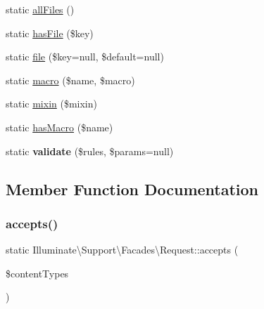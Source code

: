\begin{DoxyCompactItemize}
static \mbox{\hyperlink{class_illuminate_1_1_support_1_1_facades_1_1_request_af20e1617b83e1399b3e4b80216b8413e}{all\+Files}} ()
\item 
static \mbox{\hyperlink{class_illuminate_1_1_support_1_1_facades_1_1_request_a14261036d9d8192ae6bc760d7d1a354d}{has\+File}} (\$key)
\item 
static \mbox{\hyperlink{class_illuminate_1_1_support_1_1_facades_1_1_request_a1082105b18377b3403a0e132c9b24901}{file}} (\$key=null, \$default=null)
\item 
static \mbox{\hyperlink{class_illuminate_1_1_support_1_1_facades_1_1_request_a56125949490a1267249e6260e2e56552}{macro}} (\$name, \$macro)
\item 
static \mbox{\hyperlink{class_illuminate_1_1_support_1_1_facades_1_1_request_a6584f6b2aeabae7841abca43ba830d0a}{mixin}} (\$mixin)
\item 
static \mbox{\hyperlink{class_illuminate_1_1_support_1_1_facades_1_1_request_a0ef2bf9bd9b70f547700ce96c5b41076}{has\+Macro}} (\$name)
\item 
\mbox{\label{class_illuminate_1_1_support_1_1_facades_1_1_request_a7761fe19ca20c58ed941c6b834c2e0a8}} 
static {\bfseries validate} (\$rules, \$params=null)
\end{DoxyCompactItemize}


\subsection{Member Function Documentation}
\mbox{\label{class_illuminate_1_1_support_1_1_facades_1_1_request_a356cb2b43b1c9350e34d5e8ab95230a3}} 
\subsubsection{\texorpdfstring{accepts()}{accepts()}}
{\footnotesize\ttfamily static Illuminate\textbackslash{}\+Support\textbackslash{}\+Facades\textbackslash{}\+Request\+::accepts (\begin{DoxyParamCaption}\item[{}]{\$content\+Types }\end{DoxyParamCaption})\hspace{0.3cm}{\ttfamily [static]}}

